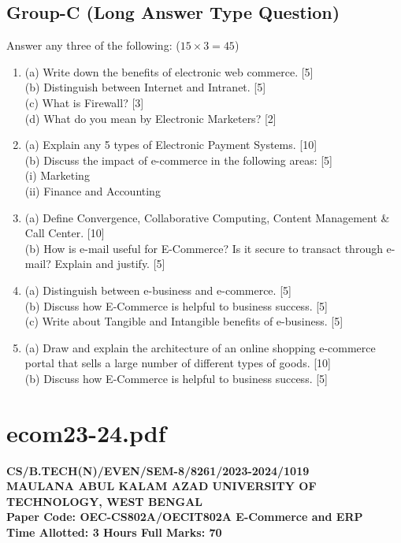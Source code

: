\subsection*{Group-C (Long Answer Type Question)}
Answer any three of the following: ($15 \times 3 = 45$)
\begin{enumerate}
    \item[7.] 
    (a) Write down the benefits of electronic web commerce. [5] \\
    (b) Distinguish between Internet and Intranet. [5] \\
    (c) What is Firewall? [3] \\
    (d) What do you mean by Electronic Marketers? [2]
    \item[8.] 
    (a) Explain any 5 types of Electronic Payment Systems. [10] \\
    (b) Discuss the impact of e-commerce in the following areas: [5] \\
    (i) Marketing \\
    (ii) Finance and Accounting
    \item[9.] 
    (a) Define Convergence, Collaborative Computing, Content Management \& Call Center. [10] \\
    (b) How is e-mail useful for E-Commerce? Is it secure to transact through e-mail? Explain and justify. [5]
    \item[10.] 
    (a) Distinguish between e-business and e-commerce. [5] \\
    (b) Discuss how E-Commerce is helpful to business success. [5] \\
    (c) Write about Tangible and Intangible benefits of e-business. [5]
    \item[11.] 
    (a) Draw and explain the architecture of an online shopping e-commerce portal that sells a large number of different types of goods. [10] \\
    (b) Discuss how E-Commerce is helpful to business success. [5]
\end{enumerate}


\newpage
\section*{ecom23-24.pdf}
\textbf{CS/B.TECH(N)/EVEN/SEM-8/8261/2023-2024/1019} \\
\textbf{MAULANA ABUL KALAM AZAD UNIVERSITY OF TECHNOLOGY, WEST BENGAL} \\
\textbf{Paper Code: OEC-CS802A/OECIT802A \hfill E-Commerce and ERP} \\
\textbf{Time Allotted: 3 Hours \hfill Full Marks: 70}

